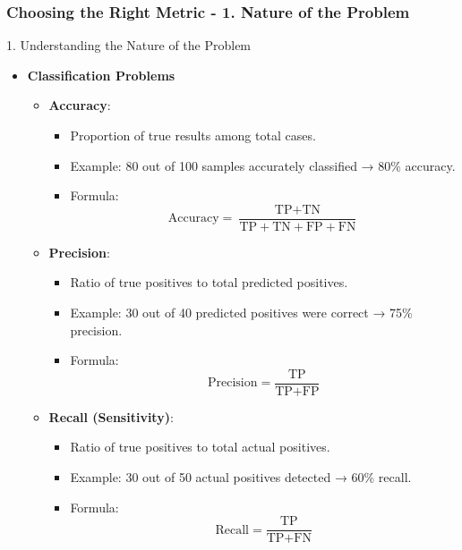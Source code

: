 \documentclass{beamer}
\begin{document}
\begin{frame}[fragile]
    \frametitle{Choosing the Right Metric - 1. Nature of the Problem}
    \begin{block}{1. Understanding the Nature of the Problem}
        \begin{itemize}
            \item \textbf{Classification Problems}
            \begin{itemize}
                \item \textbf{Accuracy}: 
                \begin{itemize}
                    \item Proportion of true results among total cases.
                    \item Example: 80 out of 100 samples accurately classified → 80\% accuracy.
                    \item Formula: 
                    \begin{equation}
                    \text{Accuracy} = \frac{\text{TP} + \text{TN}}{\text{TP} + \text{TN} + \text{FP} + \text{FN}}
                    \end{equation}
                \end{itemize}
                
                \item \textbf{Precision}: 
                \begin{itemize}
                    \item Ratio of true positives to total predicted positives.
                    \item Example: 30 out of 40 predicted positives were correct → 75\% precision.
                    \item Formula: 
                    \begin{equation}
                    \text{Precision} = \frac{\text{TP}}{\text{TP} + \text{FP}}
                    \end{equation}
                \end{itemize}
                
                \item \textbf{Recall (Sensitivity)}: 
                \begin{itemize}
                    \item Ratio of true positives to total actual positives.
                    \item Example: 30 out of 50 actual positives detected → 60\% recall.
                    \item Formula: 
                    \begin{equation}
                    \text{Recall} = \frac{\text{TP}}{\text{TP} + \text{FN}}
                    \end{equation}
                \end{itemize}
                

\end{itemize}
\end{itemize}
\end{block}
\end{frame}
\end{document}
